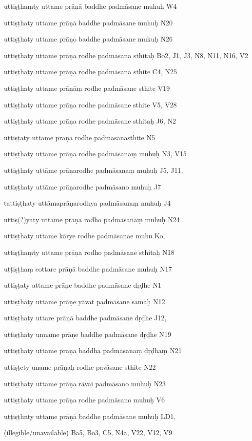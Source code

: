 \begin{ekdosis}
\begin{marma}[hp01_055]
\begin{marma}[hp02_009]
\begin{marma}[hp02_011]
\begin{marma}[hp02_012]
        \item[uttiṣṭhaṃty uttame prāṇā baddhe padmāsane muhuḥ] W4
        \item[uttiṣṭhaty uttame prāṇā baddhe padmāsane muhuḥ] N20
        \item[uttiṣṭhaty uttame prāṇo baddhe padmāsane mukuḥ] N26
        \item[uttiṣṭhaty uttame prāṇa rodhe padmāsana sthitaḥ] Bo2, J1, J3, N8, N11, N16, V2
        \item[uttiṣṭhaty uttame prāṇa rodhe padmāsana sthite] C4, N25
        \item[uttiṣṭhaty uttame prāṇāṃ rodhe padmāsane sthite] V19
        \item[uttiṣṭhaty uttame prāṇa rodhe padmāsane sthite] V5, V28
        \item[uttiṣṭhaty uttame prāṇa rodhe padmāsane sthitaḥ] J6, N2
        \item[uttiṣṭaty uttame prāṇa rodhe padmāsanasthite]  N5
        \item[uttiṣṭhaty uttame prāṇa rodhe padmāsanaṃ muhuḥ] N3, V15
        \item[uttiṣṭhaty uttāme prāṇarodhe padmāsanaṃ muhuḥ] J5, J11,
        \item[uttiṣṭhaty uttāme prāṇarodhe padmāsano muhuḥ] J7
        \item[tattiṣṭhaty uttāmaprāṇarodhya padmāsanaṃ muhuḥ] J4
        \item[uttiṣ(?)yaty uttame prāṇa rodho padmāsanaṃ muhuḥ] N24
        \item[uttiṣṭhaty uttame kārye rodhe padmāsanae muhu] Ko,
        \item[uttiṣṭhaṃty uttame prāṇa rodho padmāsane sthitaḥ] N18
        \item[uṭṭiṣṭhaṃ cottare prāṇā baddhe padmāsane muhuḥ] N17
        \item[uttiṣṭaty attame prāṇe baddhe padmāsane dṛḍhe] N1
        \item[uttiṣṭhaty uttame prāṇe yāvat padmāsane samaḥ] N12
        \item[uttiṣṭhaty uttare prāṇā baddhe padmāsane dṛḍhe] J12,
        \item[uttiṣṭhaty unname prāṇe baddhe padmāsane dṛḍhe] N19
        \item[uttiṣṭhaty uttame prāṇa baddha padmāsanaṃ dṛḍhaṃ] N21
        \item[uttiṣṭety uname prāṇaḥ rodhe pavāsane sthite] N22
        \item[uttiṣṭhaty uttame prāṇa rāvai padmāsano muhuḥ] N23
        \item[uttiṣṭhaty uttame prāṇa rodhe padmāsano muhuḥ] V6
        \item[uṭṭiṣṭhnty uttame prāṇā baddhe padmāsane muhuḥ] LD1,
        \item[(illegible/unavailable)]   Ba5, Bo3, C5, N4a, V22, V12, V9
          \begin{description}


\end{description}
\end{marma}
\end{marma}
\end{marma}
\end{marma}
\end{ekdosis}
